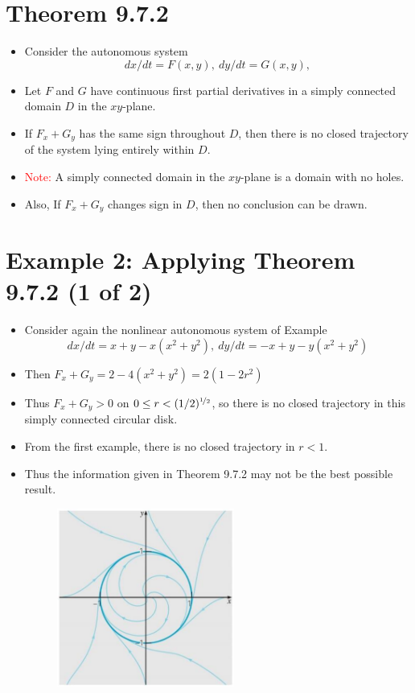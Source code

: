 \documentclass[11pt,a4paper]{article}
\begin{document}
	\section*{Theorem 9.7.2}
	\begin{itemize}
		\item Consider the autonomous system
		$$
		dx/dt = F(x,y),\ dy/dt = G(x,y),
		$$
		\item Let $F$ and $G$ have continuous first partial derivatives in a simply connected domain $D$ in the $xy$-plane.
		\item If $F_x + G_y$ has the same sign throughout $D$, then there is no closed trajectory of the system lying entirely within $D$.
		\item \textcolor{red}{Note:} A simply connected domain in the $xy$-plane is a domain with no holes.
		\item Also, If $F_x + G_y$ changes sign in $D$, then no conclusion can be drawn.
	\end{itemize}
	\section*{Example 2: Applying Theorem 9.7.2 (1 of 2)}
	\begin{itemize}
		\item Consider again the nonlinear autonomous system of Example
		$$
		dx/dt = x+y-x(x^2 + y^2),\ dy/dt = -x+y-y(x^2+y^2)
		$$
		\item Then $F_x + G_y = 2-4(x^2+y^2) = 2(1-2r^2)$
		\item Thus $F_x + G_y > 0$ on $0 \leq r < (1/2)^{\nicefrac{1}{2}}$, so there is no closed trajectory in this simply connected circular disk.
		\item From the first example, there is no closed trajectory in $r < 1$.
		\item Thus the information given in Theorem 9.7.2 may not be the best possible result.
		\begin{figure}[H]
			\centering
			\includegraphics[width=0.55\textwidth]{figure/Lec19f5.PNG}
		\end{figure}
	\end{itemize}
\end{document}
